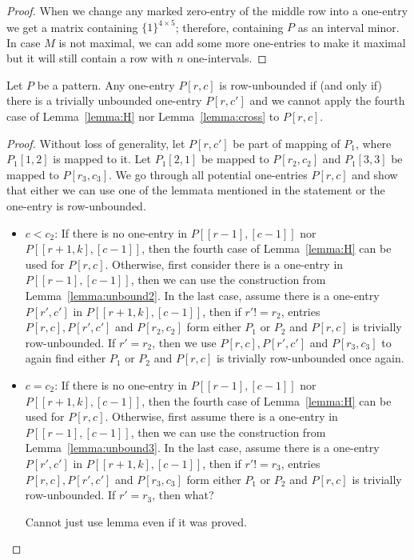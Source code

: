 \begin{proof}
When we change any marked zero-entry of the middle row into a one-entry we get a matrix containing $\{1\}^{4\times5}$; therefore, containing $P$ as an interval minor. In case $M$ is not maximal, we can add some more one-entries to make it maximal but it will still contain a row with $n$ one-intervals.
\end{proof}

\begin{thm}
Let $P$ be a pattern. Any one-entry $P[r,c]$ is row-unbounded if (and only if) there is a trivially unbounded one-entry $P[r,c']$ and we cannot apply the fourth case of Lemma~\ref{lemma:H} nor Lemma~\ref{lemma:cross} to $P[r,c]$.
\end{thm}
\begin{proof}
Without loss of generality, let $P[r,c']$ be part of mapping of $P_1$, where $P_1[1,2]$ is mapped to it. Let $P_1[2,1]$ be mapped to $P[r_2,c_2]$ and $P_1[3,3]$ be mapped to $P[r_3,c_3]$. We go through all potential one-entries $P[r,c]$ and show that either we can use one of the lemmata mentioned in the statement or the one-entry is row-unbounded.
\begin{itemize}
	\item $c<c_2$: If there is no one-entry in $P[[r-1],[c-1]]$ nor $P[[r+1,k],[c-1]]$, then the fourth case of Lemma~\ref{lemma:H} can be used for $P[r,c]$. Otherwise, first consider there is a one-entry in $P[[r-1],[c-1]]$, then we can use the construction from Lemma~\ref{lemma:unbound2}. In the last case, assume there is a one-entry $P[r',c']$ in $P[[r+1,k],[c-1]]$, then if $r'!=r_2$, entries $P[r,c],P[r',c']$ and $P[r_2,c_2]$ form either $P_1$ or $P_2$ and $P[r,c]$ is trivially row-unbounded. If $r'=r_2$, then we use $P[r,c],P[r',c']$ and $P[r_3,c_3]$ to again find either $P_1$ or $P_2$ and $P[r,c]$ is trivially row-unbounded once again.
	\item $c=c_2$: If there is no one-entry in $P[[r-1],[c-1]]$ nor $P[[r+1,k],[c-1]]$, then the fourth case of Lemma~\ref{lemma:H} can be used for $P[r,c]$. Otherwise, first assume there is a one-entry in $P[[r-1],[c-1]]$, then we can use the construction from Lemma~\ref{lemma:unbound3}. In the last case, assume there is a one-entry $P[r',c']$ in $P[[r+1,k],[c-1]]$, then if $r'!=r_3$, entries $P[r,c],P[r',c']$ and $P[r_3,c_3]$ form either $P_1$ or $P_2$ and $P[r,c]$ is trivially row-unbounded. If $r'=r_3$, then what?
	
	Cannot just use lemma even if it was proved.
	

\end{itemize}
\end{proof}
